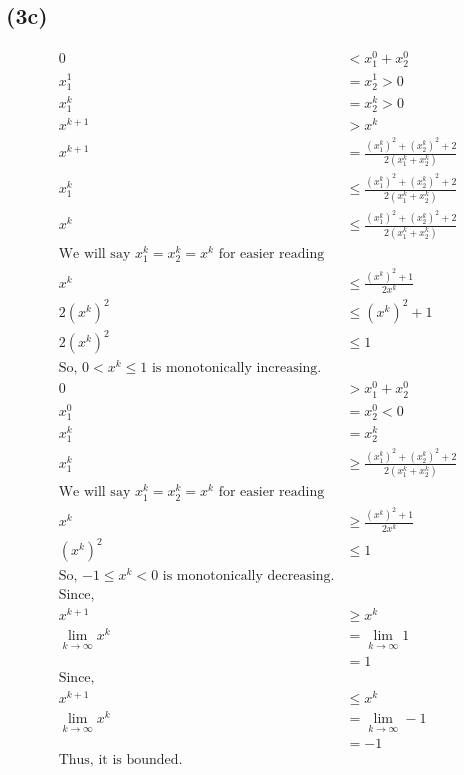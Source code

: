 \documentclass{article}
\begin{document}
\subsection*{(3c)}

\begin{align*}
    0 &< x_1^0 + x_2^0 \\
    x_1^1 &= x_2^1 > 0 \\
    x_1^k &= x_2^k >0\\
    x^{k+1} &> x^k \\
    x^{k+1} &= \frac{(x_1^k)^2 + (x_2^k)^2 + 2}{2(x_1^k + x_2^k)}\\
    x_1^k & \le \frac{(x_1^k)^2 + (x_2^k)^2 + 2}{2(x_1^k + x_2^k)}\\
    x^k & \le \frac{(x_1^k)^2 + (x_2^k)^2 + 2}{2(x_1^k + x_2^k)}\\
    \text{We will say $x_1^k = x_2^k = x^k$ for easier reading}&\\
    x^k & \le \frac{(x^k)^2 +1}{2x^k}\\
    2(x^k)^2 & \le (x^k)^2 +1  \\
    2(x^k)^2 & \le 1 \\
    \text{So, $0 <x^k \le 1$ is monotonically increasing.}&\\
    0 & > x_1^0 + x_2^0 \\
    x_1^0 &= x_2^0 < 0 \\
    x_1^k &= x_2^k \\
    x_1^k & \ge \frac{(x_1^k)^2 + (x_2^k)^2 + 2}{2(x_1^k + x_2^k)}\\
    \text{We will say $x_1^k = x_2^k = x^k$ for easier reading}&\\
    x^k & \ge  \frac{(x^k)^2 +1}{2x^k}\\
    (x^k)^2 & \le 1 \\
    \text{So, $-1 \le x^k < 0$ is monotonically decreasing.}&\\
    \text{Since,}&\\
    x^{k+1} & \ge x^k\\
    \lim_{k \to \infty} x^k &= \lim_{k \to \infty} 1\\
    &= 1\\
     \text{Since,}&\\
    x^{k+1} & \le x^k\\
    \lim_{k \to \infty} x^k &= \lim_{k \to \infty} -1\\
    &= -1\\
    \text{Thus, it is bounded.}
\end{align*}
\end{document}
